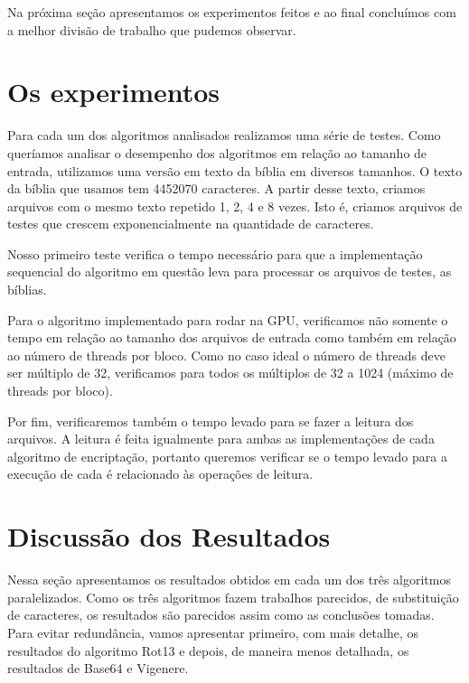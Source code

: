 \documentclass[12pt]{article}
\begin{document}
Na próxima seção apresentamos os experimentos feitos e ao final 
concluímos com a melhor divisão de trabalho que pudemos observar.


\newpage
\section{Os experimentos}
Para cada um dos algoritmos analisados realizamos uma série de testes. 
Como queríamos analisar o desempenho dos algoritmos em relação ao 
tamanho de entrada, utilizamos uma versão em texto da bíblia em
diversos tamanhos. O texto da bíblia que usamos tem 4452070 caracteres.
A partir desse texto, criamos arquivos com o mesmo texto repetido 1, 2,
4 e 8 vezes. Isto é, criamos arquivos de testes que crescem 
exponencialmente na quantidade de caracteres.

Nosso primeiro teste verifica o tempo necessário para que a 
implementação sequencial do algoritmo em questão leva para processar os
arquivos de testes, as bíblias.

Para o algoritmo implementado para rodar na GPU, verificamos não
somente o tempo em relação ao tamanho dos arquivos de entrada como
também em relação ao número de threads por bloco. Como no caso ideal o
número de threads deve ser múltiplo de 32, verificamos para todos os
múltiplos de 32 a 1024 (máximo de threads por bloco).

Por fim, verificaremos também o tempo levado para se fazer a leitura dos
arquivos. A leitura é feita igualmente para ambas as implementações de
cada algoritmo de encriptação, portanto queremos verificar se o tempo
levado para a execução de cada é relacionado às operações de leitura.


\newpage
\section{Discussão dos Resultados}
Nessa seção apresentamos os resultados obtidos em cada um dos três 
algoritmos paralelizados. Como os três algoritmos fazem trabalhos 
parecidos, de substituição de caracteres, os resultados são parecidos
assim como as conclusões tomadas. Para evitar redundância, vamos 
apresentar primeiro, com mais detalhe, os resultados do algoritmo Rot13
e depois, de maneira menos detalhada, os resultados de Base64 e 
Vigenere.
\end{document}
